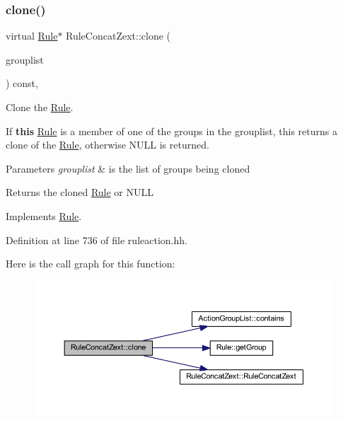 \subsubsection{\texorpdfstring{clone()}{clone()}}
{\footnotesize\ttfamily virtual \mbox{\hyperlink{class_rule}{Rule}}$\ast$ Rule\+Concat\+Zext\+::clone (\begin{DoxyParamCaption}\item[{const \mbox{\hyperlink{class_action_group_list}{Action\+Group\+List}} \&}]{grouplist }\end{DoxyParamCaption}) const\hspace{0.3cm}{\ttfamily [inline]}, {\ttfamily [virtual]}}



Clone the \mbox{\hyperlink{class_rule}{Rule}}. 

If {\bfseries{this}} \mbox{\hyperlink{class_rule}{Rule}} is a member of one of the groups in the grouplist, this returns a clone of the \mbox{\hyperlink{class_rule}{Rule}}, otherwise N\+U\+LL is returned. 
\begin{DoxyParams}{Parameters}
{\em grouplist} & is the list of groups being cloned \\
\hline
\end{DoxyParams}
\begin{DoxyReturn}{Returns}
the cloned \mbox{\hyperlink{class_rule}{Rule}} or N\+U\+LL 
\end{DoxyReturn}


Implements \mbox{\hyperlink{class_rule_a70de90a76461bfa7ea0b575ce3c11e4d}{Rule}}.



Definition at line 736 of file ruleaction.\+hh.

Here is the call graph for this function\+:
\nopagebreak
\begin{figure}[H]
\begin{center}
\leavevmode
\includegraphics[width=350pt]{class_rule_concat_zext_a0226be4927a0d964699fb17ba49804af_cgraph}
\end{center}
\end{figure}
\mbox{\label{class_rule_concat_zext_afb47ec17657319ca0a325574c4552413}} 
